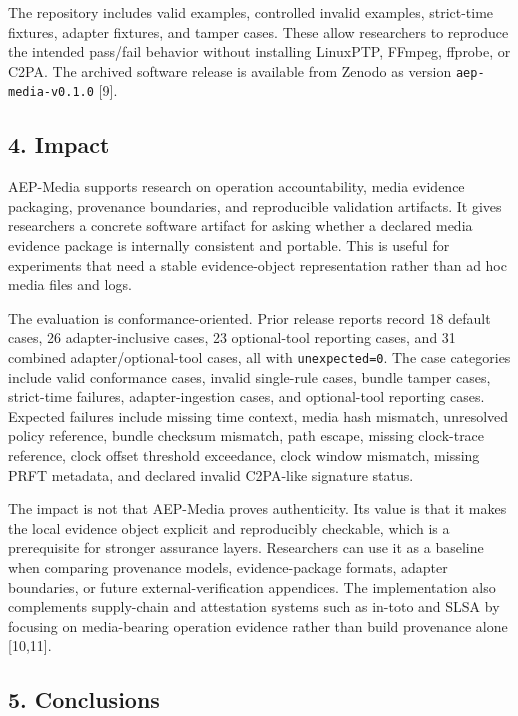 \documentclass[
]{article}
\begin{document}
The repository includes valid examples, controlled invalid examples,
strict-time fixtures, adapter fixtures, and tamper cases. These allow
researchers to reproduce the intended pass/fail behavior without
installing LinuxPTP, FFmpeg, ffprobe, or C2PA. The archived software
release is available from Zenodo as version \texttt{aep-media-v0.1.0}
{[}9{]}.

\subsection{4. Impact}\label{impact}

AEP-Media supports research on operation accountability, media evidence
packaging, provenance boundaries, and reproducible validation artifacts.
It gives researchers a concrete software artifact for asking whether a
declared media evidence package is internally consistent and portable.
This is useful for experiments that need a stable evidence-object
representation rather than ad hoc media files and logs.

The evaluation is conformance-oriented. Prior release reports record 18
default cases, 26 adapter-inclusive cases, 23 optional-tool reporting
cases, and 31 combined adapter/optional-tool cases, all with
\texttt{unexpected=0}. The case categories include valid conformance
cases, invalid single-rule cases, bundle tamper cases, strict-time
failures, adapter-ingestion cases, and optional-tool reporting cases.
Expected failures include missing time context, media hash mismatch,
unresolved policy reference, bundle checksum mismatch, path escape,
missing clock-trace reference, clock offset threshold exceedance, clock
window mismatch, missing PRFT metadata, and declared invalid C2PA-like
signature status.

The impact is not that AEP-Media proves authenticity. Its value is that
it makes the local evidence object explicit and reproducibly checkable,
which is a prerequisite for stronger assurance layers. Researchers can
use it as a baseline when comparing provenance models, evidence-package
formats, adapter boundaries, or future external-verification appendices.
The implementation also complements supply-chain and attestation systems
such as in-toto and SLSA by focusing on media-bearing operation evidence
rather than build provenance alone {[}10,11{]}.

\subsection{5. Conclusions}\label{conclusions}
\end{document}
